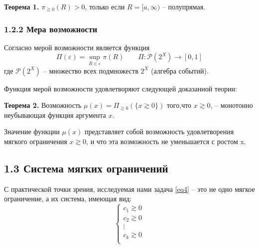 \documentclass[12pt, a4paper, oneside]{article}
\begin{document}
				\textbf{Теорема 1.} $\pi_{\gtrsim 0}(R)>0$, только если $R = [a,\infty)$ -- полупрямая.\\
				
				
				
				\begin{center}
				\end{center}
			
			\subsubsection{1.2.2 Мера возможности}
				Согласно \cite{1} мерой возможности является функция
				\[\Pi(\varepsilon) = \sup_{R\in\varepsilon}\pi(R)\qquad\Pi:\mathcal{P}(2^X)\to[0,1]\]
				где $\mathcal{P}(2^X)$ -- множество всех подмножеств $2^X$ (алгебра событий).
				
				Функция мерой возможности удовлетворяют следующей доказанной теории:
				
				\textbf{Теорема 2.} Возможность $\mu(x) = \Pi_{\gtrsim 0}(\{x\gtrsim 0\})$ того,что $x\gtrsim 0$, -- монотонно неубывающая функция аргумента $x$.
				
				Значение функции $\mu(x)$ представляет собой возможность удовлетворения мягкого ограничения $x\gtrsim 0$, и что эта возможность не уменьшается с ростом x.\\
				
		\subsection{1.3 Система мягких ограничений}
			С практической точки зрения, исследуемая нами задача \eqref{eq4} -- это не одно мягкое ограничение, а их система, имеющая вид:
			\[
				\left\{
				\begin{array}{lr}
					c_1 \gtrsim 0\\
					c_2 \gtrsim 0\\
					\vdots\\
					c_k \gtrsim 0\\
				\end{array}
				\right.
			\]
\end{document}
